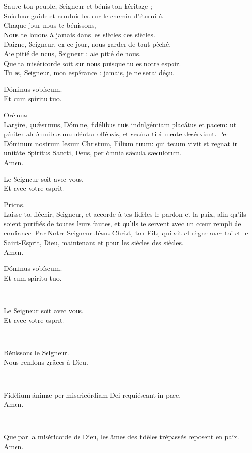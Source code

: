 \documentclass[twoside]{article}
\begin{document}
\begin{paracol}[1]{2}
\newpage
Sauve ton peuple, Seigneur et bénis ton héritage ;\\
Sois leur guide et conduis-les sur le chemin d’éternité.\\
Chaque jour nous te bénissons,\\
Nous te louons à jamais dans les siècles des siècles.\\
Daigne, Seigneur, en ce jour, nous garder de tout péché.\\
Aie pitié de nous, Seigneur : aie pitié de nous.\\
Que ta miséricorde soit sur nous puisque tu es notre espoir.\\
Tu es, Seigneur, mon espérance : jamais, je ne serai déçu.

\switchcolumn*

\vv Dóminus vobíscum. \\
\rr Et cum spíritu tuo.

Orémus.\\
Largíre, quǽsumus, Dómine, fidélibus tuis indulgéntiam placátus et pacem: ut páriter ab ómnibus mundéntur offénsis, et secúra tibi mente desérviant.
Per Dóminum nostrum Iesum Christum, Fílium tuum: qui tecum vivit et regnat in unitáte Spíritus Sancti, Deus, per ómnia sǽcula sæculórum. \\
\rr Amen.

\switchcolumn

\vv Le Seigneur soit avec vous. \\
\rr Et avec votre esprit.

Prions. \\
Laisse-toi fléchir, Seigneur, et accorde à tes fidèles le pardon et la paix, afin qu’ils soient purifiés de toutes leurs fautes, et qu’ils te servent avec un cœur rempli de confiance.
Par Notre Seigneur Jésus Christ, ton Fils, qui vit et règne avec toi et le Saint-Esprit, Dieu, maintenant et pour les siècles des siècles.\\
\rr Amen.

\switchcolumn*

\vv Dóminus vobíscum. \\
\rr Et cum spíritu tuo.

~~


\switchcolumn

\vv Le Seigneur soit avec vous. \\
\rr Et avec votre esprit.

~~

\vv Bénissons le Seigneur. \\
\rr Nous rendons grâces à Dieu.

\switchcolumn*

~~

\vv Fidélium ánimæ per misericórdiam Dei requiéscant in pace. \\
\rr Amen.

\switchcolumn

~~

\vv Que par la miséricorde de Dieu, les âmes des fidèles trépassés reposent en paix. \\
\rr Amen.

\end{paracol}
\end{document}
